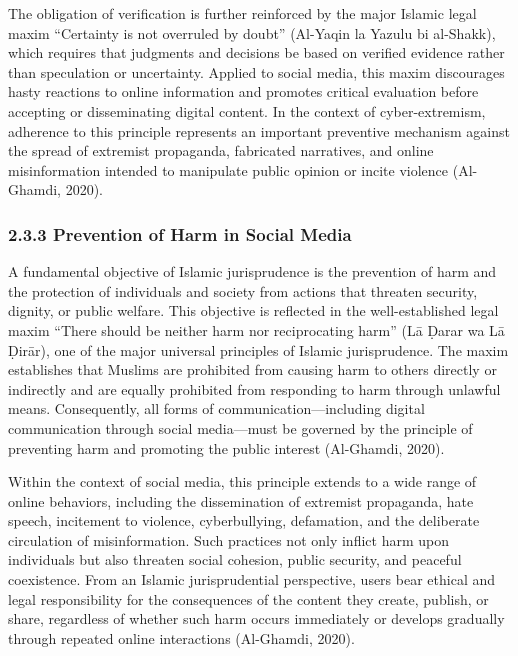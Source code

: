 \documentclass[10pt]{NSP1}
\begin{document}
	The obligation of verification is further reinforced by the major Islamic legal maxim ``Certainty is not overruled by doubt'' (Al-Yaqin la Yazulu bi al-Shakk), which requires that judgments and decisions be based on verified evidence rather than speculation or uncertainty. Applied to social media, this maxim discourages hasty reactions to online information and promotes critical evaluation before accepting or disseminating digital content. In the context of cyber-extremism, adherence to this principle represents an important preventive mechanism against the spread of extremist propaganda, fabricated narratives, and online misinformation intended to manipulate public opinion or incite violence (Al-Ghamdi, 2020).
	
	\subsubsection*{2.3.3 Prevention of Harm in Social Media}
	
	A fundamental objective of Islamic jurisprudence is the prevention of harm and the protection of individuals and society from actions that threaten security, dignity, or public welfare. This objective is reflected in the well-established legal maxim ``There should be neither harm nor reciprocating harm'' (L\={a} \d{D}arar wa L\={a} \d{D}ir\={a}r), one of the major universal principles of Islamic jurisprudence. The maxim establishes that Muslims are prohibited from causing harm to others directly or indirectly and are equally prohibited from responding to harm through unlawful means. Consequently, all forms of communication—including digital communication through social media—must be governed by the principle of preventing harm and promoting the public interest (Al-Ghamdi, 2020).
	
	Within the context of social media, this principle extends to a wide range of online behaviors, including the dissemination of extremist propaganda, hate speech, incitement to violence, cyberbullying, defamation, and the deliberate circulation of misinformation. Such practices not only inflict harm upon individuals but also threaten social cohesion, public security, and peaceful coexistence. From an Islamic jurisprudential perspective, users bear ethical and legal responsibility for the consequences of the content they create, publish, or share, regardless of whether such harm occurs immediately or develops gradually through repeated online interactions (Al-Ghamdi, 2020).
	
\end{document}
